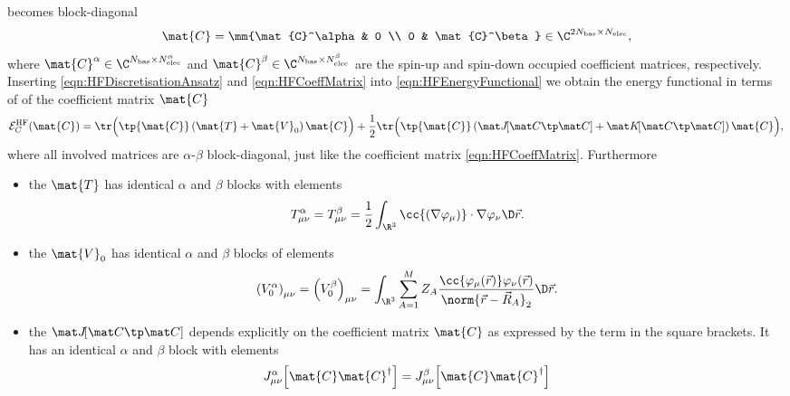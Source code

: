 \begin{rem}
	becomes block-diagonal
	\begin{equation}
		\label{eqn:HFCoeffMatrix}
		\mat{C} = \mm{\mat{C}^\alpha & 0 \\
				0 & \mat{C}^\beta}
			\in \C^{2\Nbas \times \Nelec},
	\end{equation}
	where $\mat{C}^\alpha \in \C^{\Nbas \times \NelecA}$
	and $\mat{C}^\beta \in \C^{\Nbas \times \NelecB}$
	are the spin-up and spin-down occupied coefficient matrices, respectively.
	Inserting \eqref{eqn:HFDiscretisationAnsatz} and \eqref{eqn:HFCoeffMatrix}
	into \eqref{eqn:HFEnergyFunctional}
	we obtain the \HF energy functional in terms of
	of the coefficient matrix $\mat{C}$
	\begin{equation}
		\Ehf_C(\mat{C})
			= \tr \Big( \tp{\mat{C}} \left(\mat{T} + \mat{V}_0 \right) \mat{C} \Big)
			+ \frac12 \tr \Big( \tp{\mat{C}} \left(\matJfull + \matKfull \right) \mat{C} \Big),
		\label{eqn:HFEnergyFunctionalCoeff}
	\end{equation}
	where all involved matrices are $\alpha$-$\beta$ block-diagonal,
	just like the coefficient matrix \eqref{eqn:HFCoeffMatrix}.
	Furthermore
	\begin{itemize}
		\item the 
			$\mat{T}$ has identical $\alpha$ and $\beta$ blocks
			with elements
			\begin{equation}
				T^\alpha_{\mu\nu} = T^\beta_{\mu\nu}
				= \frac12 \int_{\R^3} \cc{\left(\nabla \varphi_\mu\right)}
					\cdot \nabla \varphi_\nu \D\vec{r}.
				\label{eqn:Tbas}
			\end{equation}
		\item the  $\mat{V}_0$
			has identical $\alpha$ and $\beta$ blocks of elements
			\begin{equation}
				\left(V^\alpha_0\right)_{\mu\nu} = \left(V^\beta_0\right)_{\mu\nu}
				= \int_{\R^3} \sum_{A=1}^M Z_A
				\frac{\cc{\varphi_\mu(\vec{r})} \varphi_\nu(\vec{r})}{\norm{\vec{r} - \vec{R}_A}_2}
				\D \vec{r}.
				\label{eqn:Vbas}
			\end{equation}
		\item the  $\matJfull$
			depends explicitly on the coefficient matrix $\mat{C}$
			as expressed by the term in the square brackets.
			It has an identical $\alpha$ and $\beta$ block with elements
			\begin{equation}
				J_{\mu\nu}^\alpha\!\left[\mat{C}\mat{C}^\dagger\right]
					= J_{\mu\nu}^\beta\!\left[\mat{C}\mat{C}^\dagger\right]

\end{equation}
\end{itemize}
\end{rem}
